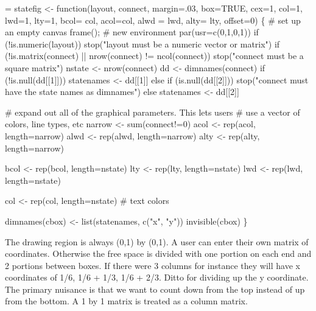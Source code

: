 \documentclass{article}
\begin{document}
\begin{nwchunk}
=
 statefig <- function(layout, connect, margin=.03, box=TRUE,
                      cex=1, col=1, lwd=1, lty=1, bcol= col,
                      acol=col, alwd = lwd, alty= lty, offset=0) \{
     # set up an empty canvas
     frame();  # new environment
     par(usr=c(0,1,0,1))
     if (!is.numeric(layout))
         stop("layout must be a numeric vector or matrix")
     if (!is.matrix(connect) || nrow(connect) != ncol(connect))
         stop("connect must be a square matrix")
     nstate <- nrow(connect)
     dd <- dimnames(connect)
     if (!is.null(dd[[1]])) statenames <- dd[[1]]
     else if (is.null(dd[[2]])) 
         stop("connect must have the state names as dimnames")
     else statenames <- dd[[2]]
 
     # expand out all of the graphical parameters.  This lets users
     #  use a vector of colors, line types, etc
     narrow <- sum(connect!=0) 
     acol <- rep(acol, length=narrow)
     alwd <- rep(alwd, length=narrow)
     alty <- rep(alty, length=narrow)
 
     bcol <- rep(bcol, length=nstate)
     lty  <- rep(lty, length=nstate)
     lwd  <- rep(lwd, length=nstate)
     
     col <- rep(col, length=nstate)  # text colors
  
     
     dimnames(cbox) <- list(statenames, c("x", "y"))
     invisible(cbox)
 \}
\end{nwchunk}

The drawing region is always (0,1) by (0,1).
A user can enter their own matrix of coordinates.
Otherwise the free space is divided with one portion
on each end and 2 portions between boxes.  If there were 3 columns for
instance they will have x coordinates of 1/6, 1/6 + 1/3, 1/6 + 2/3.  Ditto
for dividing up the y coordinate.  The primary nuisance is that we want to
count down from the top instead of up from the bottom.  A 1 by 1 matrix is
treated as a column matrix.
\end{document}
